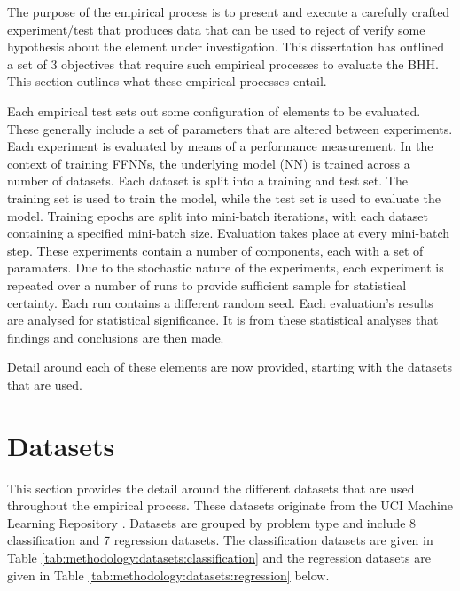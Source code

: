 The purpose of the empirical process is to present and execute a carefully crafted experiment/test that produces data that can be used to reject of verify some hypothesis about the element under investigation. This dissertation has outlined a set of 3 objectives that require such empirical processes to evaluate the \ac{BHH}. This section outlines what these empirical processes entail.

Each empirical test sets out some configuration of elements to be evaluated. These generally include a set of parameters that are altered between experiments. Each experiment is evaluated by means of a performance measurement. In the context of training \acp{FFNN}, the underlying model (\ac{NN}) is trained across a number of datasets. Each dataset is split into a training and test set. The training set is used to train the model, while the test set is used to evaluate the model. Training epochs are split into mini-batch iterations, with each dataset containing a specified mini-batch size. Evaluation takes place at every mini-batch step. These experiments contain a number of components, each with a set of paramaters. Due to the stochastic nature of the experiments, each experiment is repeated over a number of runs to provide sufficient sample for statistical certainty. Each run contains a different random seed. Each evaluation's results are analysed for statistical significance. It is from these statistical analyses that findings and conclusions are then made.

Detail around each of these elements are now provided, starting with the datasets that are used.

\section{Datasets}
\label{sec:methodology:datasets}

This section provides the detail around the different datasets that are used throughout the empirical process. These datasets originate from the UCI Machine Learning Repository \cite{ref:uci:2022}. Datasets are grouped by problem type and include 8 classification and 7 regression datasets. The classification datasets are given in Table \ref{tab:methodology:datasets:classification} and the regression datasets are given in Table \ref{tab:methodology:datasets:regression} below.

